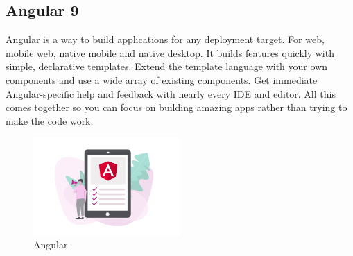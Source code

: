 \subsection{Angular 9}
Angular is a way to build applications for any deployment target. For web, mobile web, native mobile and native desktop. \newline
It builds features quickly with simple, declarative templates. Extend the template language with your own components and use a wide array of existing components. Get immediate Angular-specific help and feedback with nearly every IDE and editor. All this comes together so you can focus on building amazing apps rather than trying to make the code work. \newline

 \begin{figure}[http]%
    \center%
    \includegraphics[width=0.5\textwidth]{images/ch2/Angular.png}%
    \caption[Angular]{Angular}\label{fig: Angular}%
  \end{figure}

